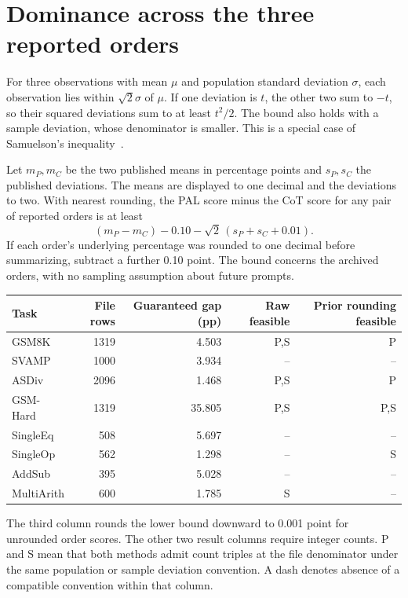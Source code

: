 \documentclass[10pt]{article}
\begin{document}
\section{Dominance across the three reported orders}
For three observations with mean $\mu$ and population standard deviation $\sigma$, each observation lies within $\sqrt{2}\sigma$ of $\mu$. If one deviation is $t$, the other two sum to $-t$, so their squared deviations sum to at least $t^2/2$. The bound also holds with a sample deviation, whose denominator is smaller. This is a special case of Samuelson's inequality~\cite{samuelson}.

Let $m_P,m_C$ be the two published means in percentage points and $s_P,s_C$ the published deviations. The means are displayed to one decimal and the deviations to two. With nearest rounding, the PAL score minus the CoT score for any pair of reported orders is at least
\[
 (m_P-m_C)-0.10-\sqrt{2}\,(s_P+s_C+0.01).
\]
If each order's underlying percentage was rounded to one decimal before summarizing, subtract a further 0.10 point. The bound concerns the archived orders, with no sampling assumption about future prompts.

\begin{center}
\begin{tabular}{lrrrr}
\toprule
Task & File rows & Guaranteed gap (pp) & Raw feasible & Prior rounding feasible\\
\midrule
GSM8K & 1319 & 4.503 & P,S & P\\
SVAMP & 1000 & 3.934 & -- & --\\
ASDiv & 2096 & 1.468 & P,S & P\\
GSM-Hard & 1319 & 35.805 & P,S & P,S\\
SingleEq & 508 & 5.697 & -- & --\\
SingleOp & 562 & 1.298 & -- & S\\
AddSub & 395 & 5.028 & -- & --\\
MultiArith & 600 & 1.785 & S & --\\
\bottomrule
\end{tabular}
\end{center}
The third column rounds the lower bound downward to 0.001 point for unrounded order scores. The other two result columns require integer counts. P and S mean that both methods admit count triples at the file denominator under the same population or sample deviation convention. A dash denotes absence of a compatible convention within that column.
\end{document}
